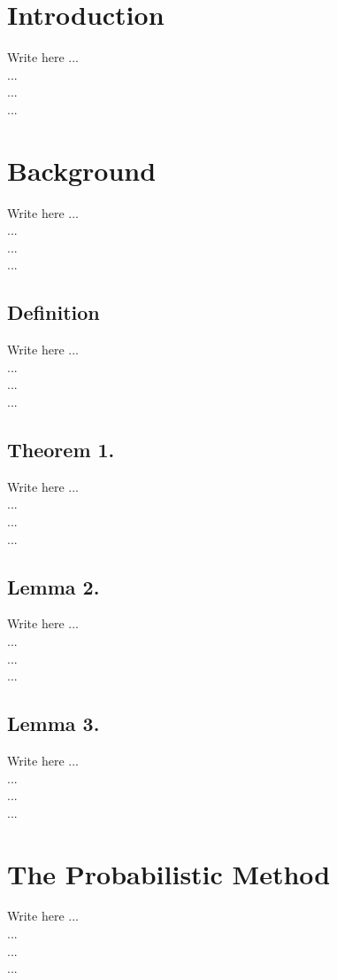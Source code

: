 \documentclass[conference]{IEEEtran}
\begin{document}
\section{Introduction}
    Write here ... \\
    ...  \\
    ...  \\
    ...  




\section{Background}
    Write here ... \\
    ...  \\
    ...  \\
    ... 
    
\subsection*{Definition}
    Write here ... \\
    ...  \\
    ...  \\
    ...  
    
\subsection*{Theorem 1.}
    Write here ... \\
    ...  \\
    ...  \\
    ...  
\subsection*{Lemma  2.}
    Write here ... \\
    ...  \\
    ...  \\
    ...  
\subsection*{Lemma  3.}
    Write here ... \\
    ...  \\
    ...  \\
    ...  



\section{The Probabilistic Method}
    Write here ... \\
    ...  \\
    ...  \\
    ...  
\end{document}

